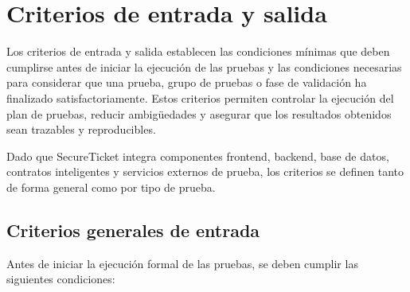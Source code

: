 \documentclass[12pt,letterpaper]{article}
\newcommand{\NombreProyecto}{SecureTicket}
\begin{document}

\section{Criterios de entrada y salida}

Los criterios de entrada y salida establecen las condiciones mínimas que deben cumplirse antes de iniciar la ejecución de las pruebas y las condiciones necesarias para considerar que una prueba, grupo de pruebas o fase de validación ha finalizado satisfactoriamente. Estos criterios permiten controlar la ejecución del plan de pruebas, reducir ambigüedades y asegurar que los resultados obtenidos sean trazables y reproducibles.

Dado que \NombreProyecto{} integra componentes frontend, backend, base de datos, contratos inteligentes y servicios externos de prueba, los criterios se definen tanto de forma general como por tipo de prueba.

\subsection{Criterios generales de entrada}

Antes de iniciar la ejecución formal de las pruebas, se deben cumplir las siguientes condiciones:
\end{document}
